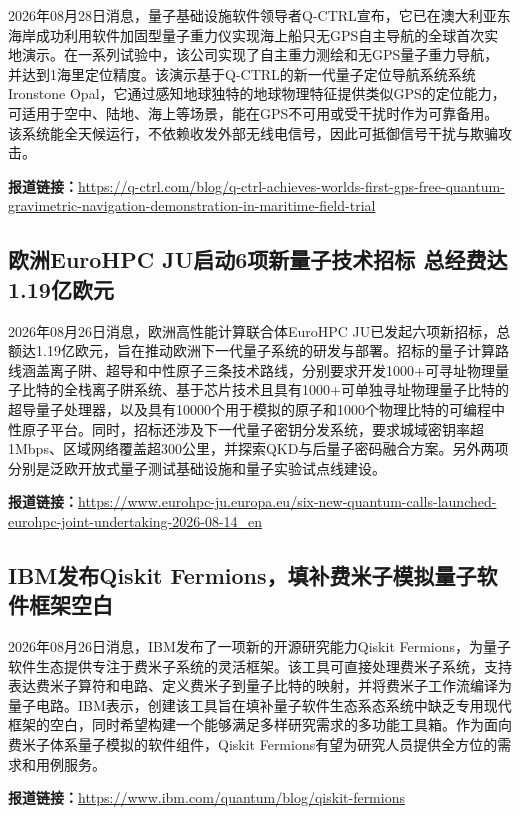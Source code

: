 \documentclass[12pt,a4paper]{ctexart}
\begin{document}
2026年08月28日消息，量子基础设施软件领导者Q-CTRL宣布，它已在澳大利亚东海岸成功利用软件加固型量子重力仪实现海上船只无GPS自主导航的全球首次实地演示。在一系列试验中，该公司实现了自主重力测绘和无GPS量子重力导航，并达到1海里定位精度。该演示基于Q-CTRL的新一代量子定位导航系统系统Ironstone Opal，它通过感知地球独特的地球物理特征提供类似GPS的定位能力，可适用于空中、陆地、海上等场景，能在GPS不可用或受干扰时作为可靠备用。该系统能全天候运行，不依赖收发外部无线电信号，因此可抵御信号干扰与欺骗攻击。

\noindent\textbf{报道链接：}\url{https://q-ctrl.com/blog/q-ctrl-achieves-worlds-first-gps-free-quantum-gravimetric-navigation-demonstration-in-maritime-field-trial}

\subsection{ 欧洲EuroHPC JU启动6项新量子技术招标 总经费达1.19亿欧元 }

2026年08月26日消息，欧洲高性能计算联合体EuroHPC JU已发起六项新招标，总额达1.19亿欧元，旨在推动欧洲下一代量子系统的研发与部署。招标的量子计算路线涵盖离子阱、超导和中性原子三条技术路线，分别要求开发1000+可寻址物理量子比特的全栈离子阱系统、基于芯片技术且具有1000+可单独寻址物理量子比特的超导量子处理器，以及具有10000个用于模拟的原子和1000个物理比特的可编程中性原子平台。同时，招标还涉及下一代量子密钥分发系统，要求城域密钥率超1Mbps、区域网络覆盖超300公里，并探索QKD与后量子密码融合方案。另外两项分别是泛欧开放式量子测试基础设施和量子实验试点线建设。

\noindent\textbf{报道链接：}\url{https://www.eurohpc-ju.europa.eu/six-new-quantum-calls-launched-eurohpc-joint-undertaking-2026-08-14\_en}

\subsection{ IBM发布Qiskit Fermions，填补费米子模拟量子软件框架空白 }

2026年08月26日消息，IBM发布了一项新的开源研究能力Qiskit Fermions，为量子软件生态提供专注于费米子系统的灵活框架。该工具可直接处理费米子系统，支持表达费米子算符和电路、定义费米子到量子比特的映射，并将费米子工作流编译为量子电路。IBM表示，创建该工具旨在填补量子软件生态系态系统中缺乏专用现代框架的空白，同时希望构建一个能够满足多样研究需求的多功能工具箱。作为面向费米子体系量子模拟的软件组件，Qiskit Fermions有望为研究人员提供全方位的需求和用例服务。

\noindent\textbf{报道链接：}\url{https://www.ibm.com/quantum/blog/qiskit-fermions}
\end{document}
